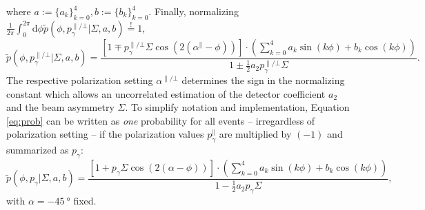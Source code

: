 where $a:=\{a_k\}_{k=0}^4, b:=\{b_k\}_{k=0}^4$. Finally, normalizing $\frac{1}{2\pi}\int_{0}^{2\pi}\text{d}\phi\tilde{p}\left(\phi,p_\gamma^{\parallel/\bot}\big|\Sigma,a,b\right)\overset{!}{=}1$,
\begin{equation}
	\tilde{p}\left(\phi,p_\gamma^{\parallel/\bot}\big|\Sigma,a,b\right)=\frac{\left[1\mp p_\gamma^{\parallel/\bot}\Sigma\cos\left(2\left(\alpha^\parallel-\phi\right)\right)\right]\cdot\left(\sum_{k=0}^4a_k\sin\left( k\phi\right)+b_k\cos\left(k\phi\right)\right)}{1\pm\frac{1}{2}a_2p_\gamma^{\parallel/\bot}\Sigma}.
	\label{eq:prob}
\end{equation}
The respective polarization setting $\alpha^{\parallel/\bot}$ determines the sign in the normalizing constant which allows an uncorrelated estimation of the detector coefficient $a_2$ and the beam asymmetry $\Sigma$. To simplify notation and implementation, Equation \eqref{eq:prob} can be written as \emph{one} probability for all events -- irregardless of polarization setting -- if the polarization values $p_\gamma^\parallel$ are multiplied by $(-1)$ and summarized as $p_\gamma$: \begin{equation}
	\tilde{p}\left(\phi,p_\gamma\big|\Sigma,a,b\right)=\frac{\left[1+p_\gamma\Sigma\cos\left(2\left(\alpha-\phi\right)\right)\right]\cdot\left(\sum_{k=0}^4a_k\sin\left( k\phi\right)+b_k\cos\left(k\phi\right)\right)}{1-\frac{1}{2}a_2p_\gamma\Sigma},
	\label{eq:prob}
\end{equation} 
with $\alpha=\SI{-45}{\degree}$ fixed.

